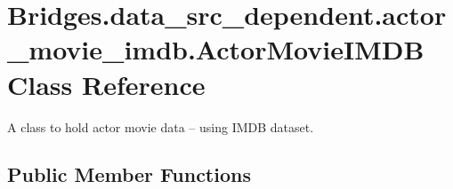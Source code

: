\hypertarget{class_bridges_1_1data__src__dependent_1_1actor__movie__imdb_1_1_actor_movie_i_m_d_b}{}\section{Bridges.\+data\+\_\+src\+\_\+dependent.\+actor\+\_\+movie\+\_\+imdb.\+Actor\+Movie\+I\+M\+D\+B Class Reference}
\label{class_bridges_1_1data__src__dependent_1_1actor__movie__imdb_1_1_actor_movie_i_m_d_b}


A class to hold actor movie data -- using I\+M\+D\+B dataset.  


\subsection*{Public Member Functions}
